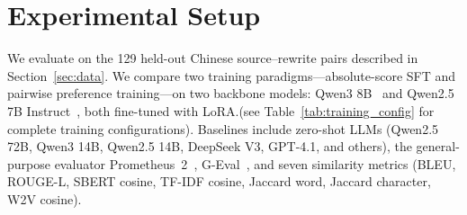 \documentclass[11pt]{article}
\begin{document}
\section{Experimental Setup}
\label{sec:setup}

We evaluate on the 129 held-out Chinese source--rewrite pairs described in Section~\ref{sec:data}.
We compare two training paradigms---absolute-score SFT and pairwise preference training---on two backbone models: Qwen3 8B~\citep{yang2025qwen3} and Qwen2.5 7B Instruct~\citep{qwen2025qwen25}, both fine-tuned with LoRA.(see Table~\ref{tab:training_config} for complete training configurations).
Baselines include zero-shot LLMs (Qwen2.5 72B, Qwen3 14B, Qwen2.5 14B, DeepSeek V3, GPT-4.1, and others), the general-purpose evaluator Prometheus~2~\citep{kim2024prometheus2}, G-Eval~\citep{liu2024geval}, and seven similarity metrics (BLEU, ROUGE-L, SBERT cosine, TF-IDF cosine, Jaccard word, Jaccard character, W2V cosine).

\begin{table}[h]
\centering
\caption{Complete training configuration for RewriteJudge.}
\label{tab:training_config}
\end{table}
\end{document}
